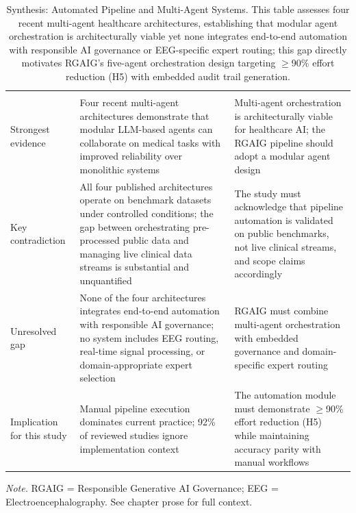 {\tablestripes\tablefontsize
\begin{xltabular}{\textwidth}{@{} l L L @{}}
\caption[Synthesis: Automated Pipeline and Multi-Agent Systems]{Synthesis: Automated Pipeline and Multi-Agent Systems. This table assesses four recent multi-agent healthcare architectures, establishing that modular agent orchestration is architecturally viable yet none integrates end-to-end automation with responsible AI governance or EEG-specific expert routing; this gap directly motivates RGAIG's five-agent orchestration design targeting $\geq$90\% effort reduction (H5) with embedded audit trail generation.}\label{tab:synth_pipeline_automation} \\
\toprule
{} &  &  \\
\midrule
\endfirsthead
\toprule
{} &  &  \\
\midrule
\endhead
\bottomrule
\endlastfoot
Strongest evidence & Four recent multi-agent architectures demonstrate that modular LLM-based agents can collaborate on medical tasks with improved reliability over monolithic systems & Multi-agent orchestration is architecturally viable for healthcare AI; the RGAIG pipeline should adopt a modular agent design \\
\addlinespace
Key contradiction & All four published architectures operate on benchmark datasets under controlled conditions; the gap between orchestrating pre-processed public data and managing live clinical data streams is substantial and unquantified & The study must acknowledge that pipeline automation is validated on public benchmarks, not live clinical streams, and scope claims accordingly \\
\addlinespace
Unresolved gap & None of the four architectures integrates end-to-end automation with responsible AI governance; no system includes EEG routing, real-time signal processing, or domain-appropriate expert selection & RGAIG must combine multi-agent orchestration with embedded governance and domain-specific expert routing \\
\addlinespace
Implication for this study & Manual pipeline execution dominates current practice; 92\% of reviewed studies ignore implementation context & The automation module must demonstrate $\geq$90\% effort reduction (H5) while maintaining accuracy parity with manual workflows \\
\end{xltabular}}
\vspace{0.3em}\noindent\textit{Note.} RGAIG = Responsible Generative AI Governance; EEG = Electroencephalography. See chapter prose for full context.

